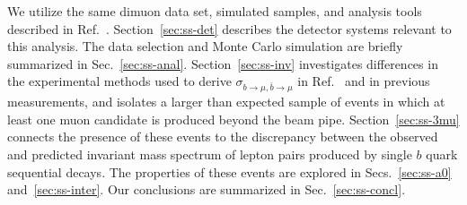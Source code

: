 \documentclass[aps,prd,preprint,floatfix,nofootinbib,superscriptaddress,showpacs,amssymb]{revtex4}
\begin{document}
 We utilize the same dimuon data set,  simulated samples, and  
 analysis tools described in  Ref.~\cite{bbxs}. Section~\ref{sec:ss-det}
 describes the detector systems relevant to this analysis. The data selection
 and Monte Carlo simulation are briefly summarized in Sec.~\ref{sec:ss-anal}.
 Section~\ref{sec:ss-inv} investigates differences in the experimental methods
 used to derive  $\sigma_{b\rightarrow\mu,\bar{b}\rightarrow \mu}$
 in Ref.~\cite{bbxs} and in previous measurements, and isolates a larger
 than expected sample of events in which at least one muon candidate
 is produced beyond the beam pipe. Section~\ref{sec:ss-3mu} connects the
 presence of these events to the discrepancy between the observed and predicted
 invariant mass spectrum of lepton pairs produced by single $b$ quark 
 sequential decays. The properties of these events are explored in 
 Secs.~\ref{sec:ss-a0} and~\ref{sec:ss-inter}. Our conclusions are summarized
 in Sec.~\ref{sec:ss-concl}. 
\end{document}
